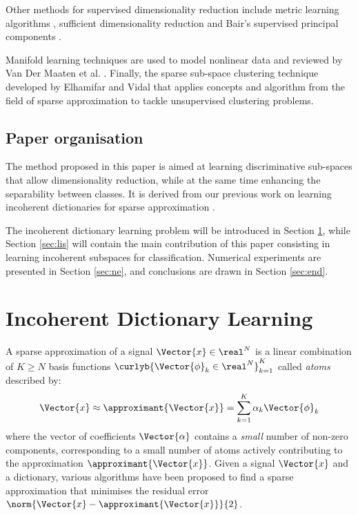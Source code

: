 \documentclass{article}
\def \fea{\Vector{x}} 	%
\def \nDim{N} 			%
\def \nAto{K} 			%
\def \iAto{k} 			%
\def \atom{\Vector{\phi}}%
\def \coeff{\Vector{\alpha}}%
\begin{document}
Other methods for supervised dimensionality reduction include metric learning algorithms \cite{xing2002distance}, sufficient dimensionality reduction \cite{li1991sliced} and Bair's supervised principal components \cite{Bair06predictionby}.

Manifold learning techniques are used to model nonlinear data and reviewed by Van Der Maaten et al. \cite{Van-Der-Maaten2009Di}. Finally,  the sparse sub-space clustering technique developed by Elhamifar and Vidal \cite{Elhamifar2013Sp} that applies concepts and algorithm from the field of sparse approximation to tackle unsupervised clustering problems.

\subsection{Paper organisation}
The method proposed in this paper is aimed at learning discriminative sub-spaces that allow dimensionality reduction, while at the same time enhancing the separability between classes. It is derived from our previous work on learning incoherent dictionaries for sparse approximation \cite{Barchiesi2013Le}.

The incoherent dictionary learning problem will be introduced in Section \ref{sec:idl}, while Section \ref{sec:lis} will contain the main contribution of this paper consisting in learning incoherent subspaces for classification. Numerical experiments are presented in Section \ref{sec:ne}, and conclusions are drawn in Section \ref{sec:end}.

\section{Incoherent Dictionary Learning}\label{sec:idl}
A sparse approximation of a signal $\fea\in\real^{\nDim}$ is a linear combination of $\nAto\geq\nDim$ basis functions $\curlyb{\atom_{\iAto}\in\real^{\nDim}}_{\iAto=1}^{\nAto}$ called \emph{atoms} described by:
\begin{equation}
	\fea \approx \approximant{\fea} = \sum_{\iAto=1}^{\nAto} \alpha_{\iAto}\atom_{\iAto}
\end{equation}
where the vector of coefficients $\coeff$ contains a \emph{small} number of non-zero components, corresponding to a small number of atoms actively contributing to the approximation $\approximant{\fea}$. Given a signal $\fea$ and a dictionary, various algorithms have been proposed to find a sparse approximation that minimises the residual error $\norm{\fea-\approximant{\fea}}{2}$\cite{Elad2010Sp}.
\end{document}
